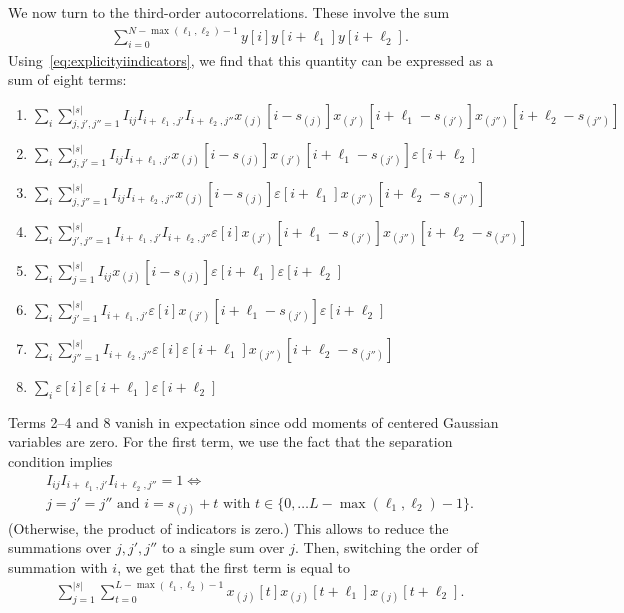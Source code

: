 \documentclass[12pt]{article}
\newcommand{\1}{\mathbf{1}}
\theoremstyle{plain}
\theoremstyle{definition}
\theoremstyle{remark}
\theoremstyle{plain}
\theoremstyle{remark}
\theoremstyle{plain}
\theoremstyle{plain}
\theoremstyle{plain}
\numberwithin{equation}{section}
\begin{document}
We now turn to the third-order autocorrelations. These involve the sum
\begin{align}
\sum_{i=0}^{N-\max(\ell_1, \ell_2)-1} y[i] y[i+\ell_1] y[i+\ell_2].
\end{align}
Using~\eqref{eq:explicityiindicators}, we find that this quantity can be expressed as a sum of eight terms:
\begin{enumerate}
	\item $\sum_i \sum_{j,j',j'' = 1}^{|s|} I_{ij} I_{i+\ell_1, j'} I_{i+\ell_2,j''} x_{(j)}[i-s_{(j)}] x_{(j')}[i+\ell_1-s_{(j')}] x_{(j'')}[i+\ell_2-s_{(j'')}]$
	\item $\sum_i \sum_{j,j' = 1}^{|s|} I_{ij} I_{i+\ell_1, j'} x_{(j)}[i-s_{(j)}] x_{(j')}[i+\ell_1-s_{(j')}] \varepsilon[i+\ell_2]$
	\item $\sum_i \sum_{j,j'' = 1}^{|s|} I_{ij} I_{i+\ell_2,j''} x_{(j)}[i-s_{(j)}] \varepsilon[i+\ell_1] x_{(j'')}[i+\ell_2-s_{(j'')}]$
	\item $\sum_i \sum_{j',j'' = 1}^{|s|} I_{i+\ell_1, j'} I_{i+\ell_2,j''} \varepsilon[i] x_{(j')}[i+\ell_1-s_{(j')}] x_{(j'')}[i+\ell_2-s_{(j'')}]$
	\item $\sum_i \sum_{j = 1}^{|s|} I_{ij} x_{(j)}[i-s_{(j)}] \varepsilon[i+\ell_1] \varepsilon[i+\ell_2]$
	\item $\sum_i \sum_{j' = 1}^{|s|} I_{i+\ell_1, j'} \varepsilon[i] x_{(j')}[i+\ell_1-s_{(j')}] \varepsilon[i+\ell_2]$
	\item $\sum_i \sum_{j'' = 1}^{|s|} I_{i+\ell_2,j''} \varepsilon[i] \varepsilon[i+\ell_1] x_{(j'')}[i+\ell_2-s_{(j'')}]$
	\item $\sum_i \varepsilon[i] \varepsilon[i+\ell_1] \varepsilon[i+\ell_2]$
\end{enumerate}
Terms 2--4 and 8 vanish in expectation since odd moments of centered Gaussian variables are zero. For the first term, we use the fact that the separation condition implies
\begin{multline}
I_{ij} I_{i+\ell_1, j'} I_{i+\ell_2,j''} = 1 \iff \\ j=j'=j'' \textrm{ and } i = s_{(j)} + t \textrm{ with } t \in \{ 0, \ldots L-\max(\ell_1, \ell_2)-1 \}.
\end{multline}
(Otherwise, the product of indicators is zero.) This allows to reduce the summations over $j,j',j''$ to a single sum over $j$. Then, switching the order of summation with $i$, we get that the first term is equal to
\begin{align}
\sum_{j=1}^{|s|} \sum_{t=0}^{L-\max(\ell_1, \ell_2)-1} x_{(j)}[t] x_{(j)}[t+\ell_1] x_{(j)}[t+\ell_2].
\end{align}
\end{document}
